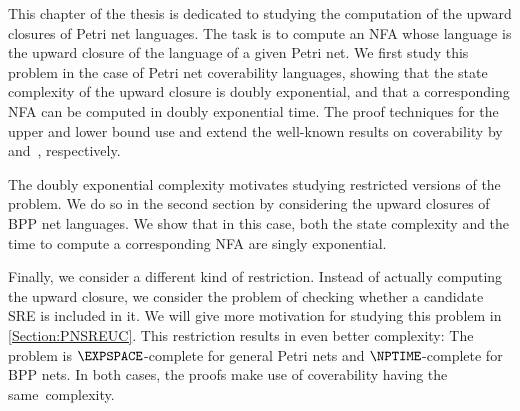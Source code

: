 \documentclass[../../diss.tex]{subfiles}
\begin{document}
This chapter of the thesis is dedicated to studying the computation of the upward closures of Petri net languages.
The task is to compute an NFA whose language is the upward closure of the language of a given Petri net.
We first study this problem in the case of Petri net coverability languages, showing that the state complexity of the upward closure is doubly exponential, and that a corresponding NFA can be computed in doubly exponential time.
The proof techniques for the upper and lower bound use and extend the well-known results on coverability by  and~, respectively.

The doubly exponential complexity motivates studying restricted versions of the problem.
We do so in the second section by considering the upward closures of BPP net languages.
We show that in this case, both the state complexity and the time to compute a corresponding NFA are singly exponential.

Finally, we consider a different kind of restriction.
Instead of actually computing the upward closure, we consider the problem of checking whether a candidate SRE is included in it.
We will give more motivation for studying this problem in \cref{Section:PNSREUC}.
This restriction results in even better complexity: The problem is $\EXPSPACE$-complete for general Petri nets and $\NPTIME$-complete for BPP nets.
In both cases, the proofs make use of coverability having the same~complexity.
\end{document}

